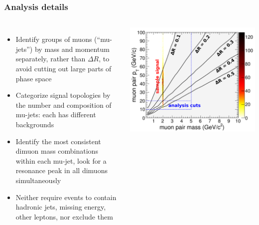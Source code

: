 \documentclass[compress]{beamer}
\begin{document}
\begin{frame}
\frametitle{Analysis details}
\begin{columns}
\begin{itemize}
\item Identify groups of muons (``mu-jets'') by mass and momentum
  separately, rather than $\Delta R$, to avoid cutting out large parts
  of phase space

\item Categorize signal topologies by the number and composition of mu-jets: each has different backgrounds

\item Identify the most consistent dimuon mass combinations within
  each mu-jet, look for a resonance peak in all dimuons simultaneously

\item Neither require events to contain hadronic jets, missing energy,
  other leptons, nor exclude them

\end{itemize}

\vspace{0.1 cm}
\includegraphics[width=\linewidth]{openingangle_with_signal.pdf}


\end{columns}
\end{frame}
\end{document}
